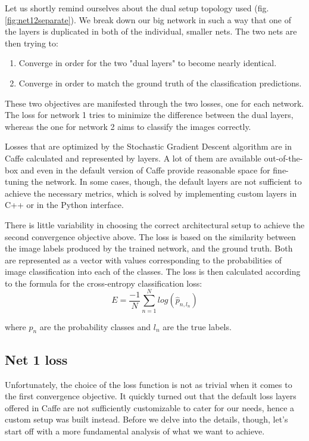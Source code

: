 \documentclass[a4paper, 12pt]{article}
\numberwithin{equation}{section}
\begin{document}
	Let us shortly remind ourselves about the dual setup topology used (fig. \ref{fig:net12separate}). We break down our big network in such a way that one of the layers is duplicated in both of the individual, smaller nets. The two nets are then trying to:
	\begin{enumerate}
		\item Converge in order for the two "dual layers" to become nearly identical.
		\item Converge in order to match the ground truth of the classification predictions.
	\end{enumerate}

	These two objectives are manifested through the two losses, one for each network. The loss for network 1 tries to minimize the difference between the dual layers, whereas the one for network 2 aims to classify the images correctly.

	Losses that are optimized by the Stochastic Gradient Descent algorithm are in Caffe calculated and represented by layers. A lot of them are available out-of-the-box and even in the default version of Caffe provide reasonable space for fine-tuning the network. In some cases, though, the default layers are not sufficient to achieve the necessary metrics, which is solved by implementing custom layers in C++ or in the Python interface.

	There is little variability in choosing the correct architectural setup to achieve the second convergence objective above. The loss is based on the similarity between the image labels produced by the trained network, and the ground truth. Both are represented as a vector with values corresponding to the probabilities of image classification into each of the classes. The loss is then calculated according to the formula for the cross-entropy classification loss:
	\begin{equation}
		E = \frac{-1}{N} \sum_{n=1}^{N} log(\hat{p}_{n,l_n})
	\end{equation}

	where $\hat{p}_n$ are the probability classes and $l_n$ are the true labels.

	\subsection{Net 1 loss}

	Unfortunately, the choice of the loss function is not as trivial when it comes to the first convergence objective. It quickly turned out that the default loss layers offered in Caffe are not sufficiently customizable to cater for our needs, hence a custom setup was built instead. Before we delve into the details, though, let's start off with a more fundamental analysis of what we want to achieve.
\end{document}
